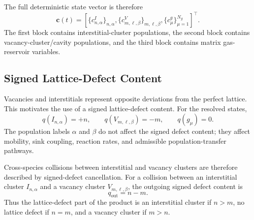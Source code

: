 The full deterministic state vector is therefore
\begin{equation}
    \mathbf{c}(t)
    =
    \left[
    \{c^I_{n,\alpha}\}_{n,\alpha},
    \{c^V_{m,\boldsymbol{\ell},\beta}\}_{m,\boldsymbol{\ell},\beta},
    \{c^g_\mu\}_{\mu=1}^{N_g}
    \right]^\top .
    \label{eq:general_state_vector}
\end{equation}
The first block contains interstitial-cluster populations, the second block
contains vacancy-cluster/cavity populations, and the third block contains
matrix gas-reservoir variables.

\subsection{Signed Lattice-Defect Content}
\label{sec:signed_lattice_defect_content}

Vacancies and interstitials represent opposite deviations from the perfect
lattice. This motivates the use of a signed lattice-defect content. For the
resolved states,
\begin{equation}
    q(I_{n,\alpha})=+n,
    \qquad
    q(V_{m,\boldsymbol{\ell},\beta})=-m,
    \qquad
    q(g_\mu)=0 .
    \label{eq:signed_defect_content}
\end{equation}
The population labels $\alpha$ and $\beta$ do not affect the signed defect
content; they affect mobility, sink coupling, reaction rates, and admissible
population-transfer pathways.

Cross-species collisions between interstitial and vacancy clusters are
therefore described by signed-defect cancellation. For a collision between an
interstitial cluster $I_{n,\alpha}$ and a vacancy cluster
$V_{m,\boldsymbol{\ell},\beta}$, the outgoing signed defect content is
\begin{equation}
    q_{\mathrm{out}} = n-m .
\end{equation}
Thus the lattice-defect part of the product is an interstitial cluster if
$n>m$, no lattice defect if $n=m$, and a vacancy cluster if $m>n$.

